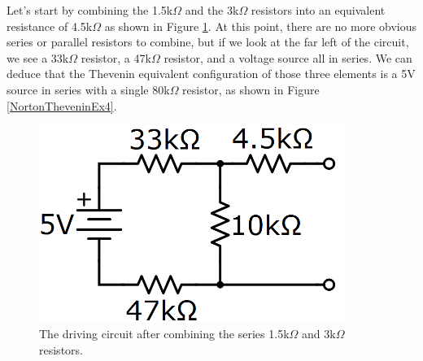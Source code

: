 \par
Let's start by combining the 1.5k$\Omega$ and the 3k$\Omega$ resistors into an equivalent resistance of 4.5k$\Omega$ as shown in Figure \ref{NortonTheveninEx3}. At this point, there are no more obvious series or parallel resistors to combine, but if we look at the far left of the circuit, we see a 33k$\Omega$ resistor, a 47k$\Omega$ resistor, and a voltage source all in series. We can deduce that the Thevenin equivalent configuration of those three elements is a 5V source in series with a single 80k$\Omega$ resistor, as shown in Figure \ref{NortonTheveninEx4}.
\begin{figure}[h!]
\centering
\includegraphics[width=10cm]{figures/nortThevEx_3.png}
\caption{The driving circuit after combining the series 1.5k$\Omega$ and 3k$\Omega$ resistors.}
\label{NortonTheveninEx3}
\end{figure}

